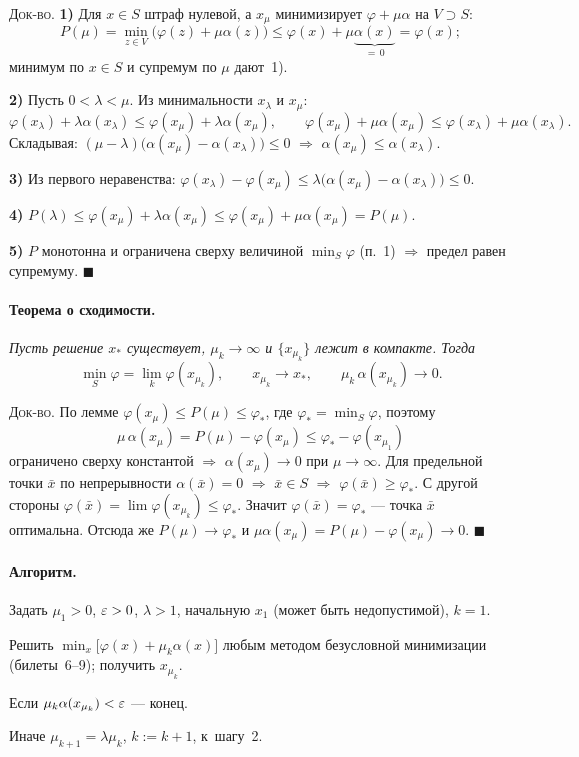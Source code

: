 \textsc{Док-во.}
\textbf{1)} Для $x \in S$ штраф нулевой, а $x_\mu$ минимизирует
$\varphi + \mu\alpha$ на $V \supset S$:
\[
  P(\mu) = \min_{z\in V}\big(\varphi(z)+\mu\alpha(z)\big)
   \le \varphi(x) + \mu\underbrace{\alpha(x)}_{=\,0} = \varphi(x) ;
\]
минимум по $x \in S$ и супремум по $\mu$ дают~1).

\textbf{2)} Пусть $0 < \lambda < \mu$. Из минимальности $x_\lambda$ и $x_\mu$:
\[
  \varphi(x_\lambda) + \lambda\alpha(x_\lambda)
    \le \varphi(x_\mu) + \lambda\alpha(x_\mu) , \qquad
  \varphi(x_\mu) + \mu\alpha(x_\mu)
    \le \varphi(x_\lambda) + \mu\alpha(x_\lambda) .
\]
Складывая: $(\mu-\lambda)\big(\alpha(x_\mu) - \alpha(x_\lambda)\big) \le 0$
$\Rightarrow$ $\alpha(x_\mu) \le \alpha(x_\lambda)$.

\textbf{3)} Из первого неравенства:
$\varphi(x_\lambda) - \varphi(x_\mu) \le
 \lambda\big(\alpha(x_\mu)-\alpha(x_\lambda)\big) \le 0$.

\textbf{4)}
$P(\lambda) \le \varphi(x_\mu) + \lambda\alpha(x_\mu)
 \le \varphi(x_\mu) + \mu\alpha(x_\mu) = P(\mu)$.

\textbf{5)} $P$ монотонна и ограничена сверху величиной $\min_S\varphi$ (п.~1)
$\Rightarrow$ предел равен супремуму. $\blacksquare$

\paragraph{Теорема о сходимости.}
\textit{Пусть решение $x_*$ существует, $\mu_k \to \infty$ и $\{x_{\mu_k}\}$
лежит в компакте. Тогда}
\[
  \min_{S}\varphi = \lim_k \varphi(x_{\mu_k}) , \qquad
  x_{\mu_k} \to x_* , \qquad
  \mu_k\,\alpha(x_{\mu_k}) \to 0 .
\]

\textsc{Док-во.} По лемме $\varphi(x_\mu) \le P(\mu) \le \varphi_*$, где
$\varphi_* = \min_S\varphi$, поэтому
\[
  \mu\,\alpha(x_\mu) = P(\mu) - \varphi(x_\mu)
   \le \varphi_* - \varphi(x_{\mu_1})
\]
ограничено сверху константой $\Rightarrow$ $\alpha(x_\mu) \to 0$ при
$\mu \to \infty$. Для предельной точки $\bar{x}$ по непрерывности
$\alpha(\bar{x}) = 0$ $\Rightarrow$ $\bar{x} \in S$ $\Rightarrow$
$\varphi(\bar{x}) \ge \varphi_*$. С другой стороны
$\varphi(\bar{x}) = \lim\varphi(x_{\mu_k}) \le \varphi_*$. Значит
$\varphi(\bar{x}) = \varphi_*$ — точка $\bar{x}$ оптимальна. Отсюда же
$P(\mu) \to \varphi_*$ и $\mu\alpha(x_\mu) = P(\mu) - \varphi(x_\mu) \to 0$.
$\blacksquare$

\paragraph{Алгоритм.}
\begin{csteps}
  \item Задать $\mu_1 > 0$, $\varepsilon > 0$, $\lambda > 1$, начальную $x_1$ (может
        быть недопустимой), $k = 1$.
  \item Решить $\min_x\big[\varphi(x) + \mu_k\alpha(x)\big]$ любым методом
        безусловной минимизации (билеты~6--9); получить $x_{\mu_k}$.
  \item Если $\mu_k\alpha(x_{\mu_k}) < \varepsilon$ — конец.
  \item Иначе $\mu_{k+1} = \lambda\mu_k$, $k := k+1$, к~шагу~2.
\end{csteps}


